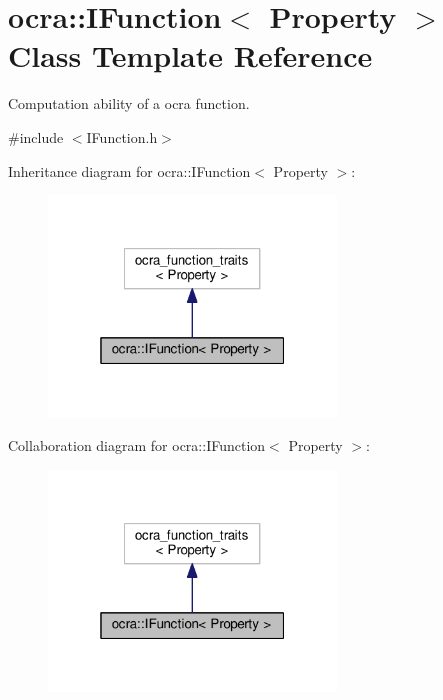 \hypertarget{classocra_1_1IFunction}{}\section{ocra\+:\+:I\+Function$<$ Property $>$ Class Template Reference}
\label{classocra_1_1IFunction}


Computation ability of a ocra function.  




{\ttfamily \#include $<$I\+Function.\+h$>$}



Inheritance diagram for ocra\+:\+:I\+Function$<$ Property $>$\+:
\nopagebreak
\begin{figure}[H]
\begin{center}
\leavevmode
\includegraphics[width=217pt]{d9/d48/classocra_1_1IFunction__inherit__graph}
\end{center}
\end{figure}


Collaboration diagram for ocra\+:\+:I\+Function$<$ Property $>$\+:
\nopagebreak
\begin{figure}[H]
\begin{center}
\leavevmode
\includegraphics[width=217pt]{d9/d85/classocra_1_1IFunction__coll__graph}
\end{center}
\end{figure}
